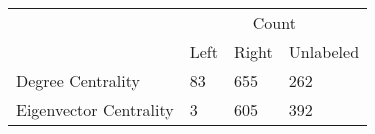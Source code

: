     \centering
    \begin{tabular}{llll}
    \toprule\toprule
         & \multicolumn{3}{c}{Count} \\
             \cmidrule(lr){2-4} 
        ~ & Left & Right & Unlabeled \\ \midrule
        Degree Centrality & 83 & 655 & 262 \\ 
        Eigenvector Centrality & 3 & 605 & 392 \\ 
        \bottomrule\bottomrule
    \end{tabular}